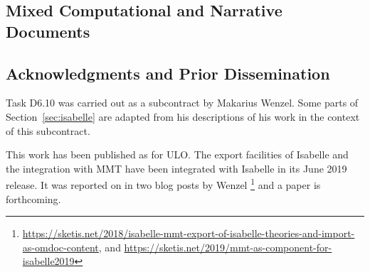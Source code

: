 \subsection{Mixed Computational and Narrative Documents}

\subsection{Acknowledgments and Prior Dissemination}
Task D6.10  was carried out as a subcontract by Makarius Wenzel.
Some parts of Section~\ref{sec:isabelle} are adapted from his descriptions of his work in the context of this subcontract.

This work has been published as  for ULO.
The export facilities of Isabelle and the integration with MMT have been integrated with Isabelle in its June 2019 release.
It was reported on in two blog posts by Wenzel%
\footnote{\url{https://sketis.net/2018/isabelle-mmt-export-of-isabelle-theories-and-import-as-omdoc-content}, and \url{https://sketis.net/2019/mmt-as-component-for-isabelle2019}}
and a paper is forthcoming.

